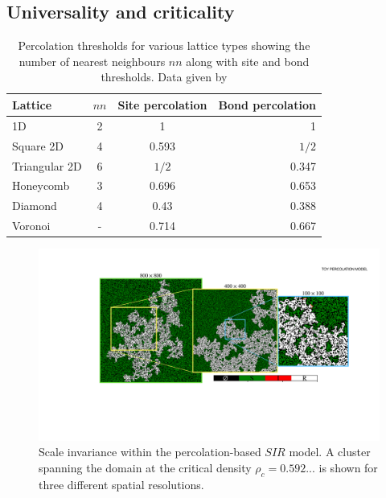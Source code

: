 \subsection{Universality and criticality}
\label{section:universality}
\begin{table}[h!]
  \begin{center}
    \begin{tabular}{l|c|c|r} %
    \hline
      \textbf{Lattice} & $nn$ & \textbf{Site percolation} & \textbf{Bond percolation}\\
      \hline
      1D & 2 & 1 & 1\\
      Square 2D & 4 & 0.593 & $1/2$\\
      Triangular 2D & 6 & $1/2$ & 0.347\\
      Honeycomb & 3 & 0.696 & 0.653\\
      Diamond & 4 & 0.43 & 0.388\\
      Voronoi & - & 0.714 & 0.667\\
    \hline
    \end{tabular}
    \caption{Percolation thresholds for various lattice types showing the number of nearest neighbours $nn$ along with site and bond thresholds. Data given by \cite{stauffer2018introduction, PhysRevE.80.041101}}
    \label{tab:perc}
  \end{center}
\end{table}

\begin{figure}
    \centering
    \includegraphics[scale=0.325]{chapter3/figures/figure3.pdf}
    \caption{Scale invariance within the percolation-based $SIR$ model. A cluster spanning the domain at the critical density $\rho_c = 0.592...$ is shown for three different spatial resolutions.}
    \label{fig:ch3-perc-invariance}
\end{figure}

